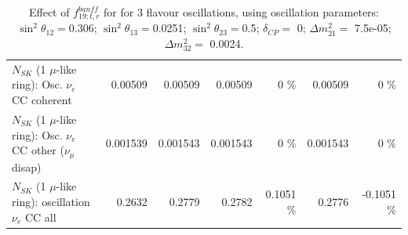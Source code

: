 \begin{table}
\begin{tabular}{| l | r | r | r  r | r  r |}
                          $N_{SK}$ (1 $\mu$-like ring): Osc. $\nu_e$ CC coherent &         0.00509 &         0.00509 &         0.00509 &        0 \%  &         0.00509 &        0 \%  \\ 
           $N_{SK}$ (1 $\mu$-like ring): Osc. $\nu_e$ CC other ($\nu_\mu$ disap) &        0.001539 &        0.001543 &        0.001543 &        0 \%  &        0.001543 &        0 \%  \\ 
                        $N_{SK}$ (1 $\mu$-like ring): oscillation $\nu_e$ CC all &          0.2632 &          0.2779 &          0.2782 &   0.1051 \%  &          0.2776 &  -0.1051 \%  \\ 
\hline
\hline
\end{tabular}
\caption{ Effect of $f_{19; t, r}^{banff}$ for for 3 flavour oscillations, using oscillation parameters:  $\sin^2\theta_{12} = $0.306; $\sin^2\theta_{13} = $0.0251; $\sin^2\theta_{23} = $0.5; $\delta_{CP} = $        0; $\Delta m^2_{21} = $    7.5e-05; $\Delta m^2_{32} = $    0.0024. }
\label{tab:num_banff_ccqeE1_1RmuT_3f_osc_t13:0.0251}
\end{table}
\clearpage
